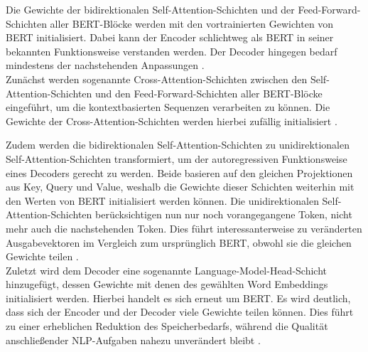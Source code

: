 \noindent
Die Gewichte der bidirektionalen Self-Attention-Schichten und der Feed-Forward-Schichten aller \ac{BERT}-Blöcke werden mit den vortrainierten Gewichten von \ac{BERT} initialisiert. Dabei kann der Encoder schlichtweg als \ac{BERT} in seiner bekannten Funktionsweise verstanden werden. Der Decoder hingegen bedarf mindestens der nachstehenden Anpassungen \cite{VON20}.\\

\noindent
Zunächst werden sogenannte Cross-Attention-Schichten zwischen den Self-Attention-Schichten und den Feed-Forward-Schichten aller \ac{BERT}-Blöcke eingeführt, um die kontextbasierten Sequenzen verarbeiten zu können. Die Gewichte der Cross-Attention-Schichten werden hierbei zufällig initialisiert \cite{VON20}.
\newpage

\noindent
Zudem werden die bidirektionalen Self-Attention-Schichten zu unidirektionalen Self-Attention-Schichten transformiert, um der autoregressiven Funktionsweise eines Decoders gerecht zu werden. Beide basieren auf den gleichen Projektionen aus Key, Query und Value, weshalb die Gewichte dieser Schichten weiterhin mit den Werten von \ac{BERT} initialisiert werden können. Die unidirektionalen Self-Attention-Schichten berücksichtigen nun nur noch vorangegangene Token, nicht mehr auch die nachstehenden Token. Dies führt interessanterweise zu veränderten Ausgabevektoren im Vergleich zum ursprünglich \ac{BERT}, obwohl sie die gleichen Gewichte teilen \cite[S.~2]{ROT20}.\\

\noindent
Zuletzt wird dem Decoder eine sogenannte Language-Model-Head-Schicht hinzugefügt, dessen Gewichte mit denen des gewählten Word Embeddings initialisiert werden. Hierbei handelt es sich erneut um \ac{BERT}. Es wird deutlich, dass sich der Encoder und der Decoder viele Gewichte teilen können. Dies führt zu einer erheblichen Reduktion des Speicherbedarfs, während die Qualität anschließender \ac{NLP}-Aufgaben nahezu unverändert bleibt \cite[S.~2]{ROT20}.\\


